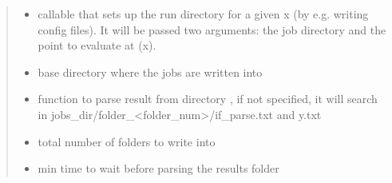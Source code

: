 \documentclass[letterpaper,12pt,english]{sphinxmanual}
\begin{document}
\begin{fulllineitems}
\begin{quote}
\begin{description}
\begin{itemize}
\item {} 
\sphinxAtStartPar
{} \textendash{} callable that sets up the run directory for a given x (by e.g. writing config files).     It will be passed two arguments: the job directory and the point to evaluate at (x).

\item {} 
\sphinxAtStartPar
{} \textendash{} base directory where the jobs are written into

\item {} 
\sphinxAtStartPar
{} \textendash{} function to parse result from directory , if not specified, it will search in     jobs\_dir/folder\_\textless{}folder\_num\textgreater{}/if\_parse.txt and y.txt

\item {} 
\sphinxAtStartPar
{} \textendash{} total number of folders to write into

\item {} 
\sphinxAtStartPar
{} \textendash{} min time to wait before parsing the results folder

\end{itemize}

\end{description}\end{quote}


\end{fulllineitems}
\end{document}
